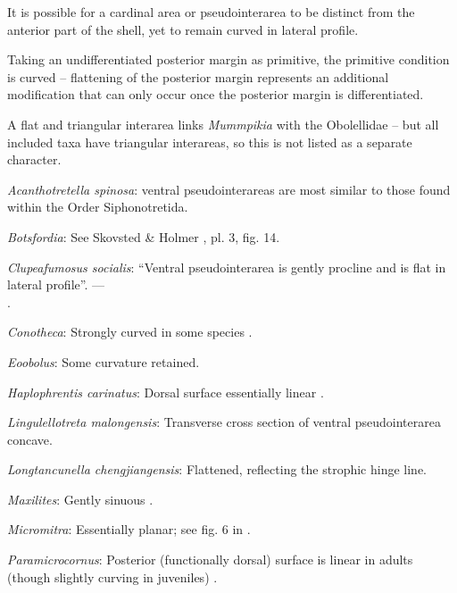 \documentclass[openany]{book}
\begin{document}
It is possible for a cardinal area or pseudointerarea to be distinct
from the anterior part of the shell, yet to remain curved in lateral
profile.

Taking an undifferentiated posterior margin as primitive, the primitive
condition is curved -- flattening of the posterior margin represents an
additional modification that can only occur once the posterior margin is
differentiated.

A flat and triangular interarea links \emph{Mummpikia} with the
Obolellidae \citep{Balthasar2008iMummpikia} -- but all included taxa
have triangular interareas, so this is not listed as a separate
character.

\hypertarget{Acanthotretella_spinosa-coding-108}{}
\emph{Acanthotretella spinosa}: ventral pseudointerareas are most
similar to those found within the Order Siphonotretida.

\hypertarget{Botsfordia-coding-108}{}
\emph{Botsfordia}: See Skovsted \& Holmer
\citeyearpar{Skovsted2005EarlyCambrian}, pl. 3, fig. 14.

\hypertarget{Clupeafumosus_socialis-coding-108}{}
\emph{Clupeafumosus socialis}: ``Ventral pseudointerarea is gently
procline and is flat in lateral profile''. ---\\
\citep{Topper2013Reappraisalof}.

\hypertarget{Conotheca-coding-108}{}
\emph{Conotheca}: Strongly curved in some species \citep{Wrona2003}.

\hypertarget{Eoobolus-coding-108}{}
\emph{Eoobolus}: Some curvature retained.

\hypertarget{Haplophrentis_carinatus-coding-108}{}
\emph{Haplophrentis carinatus}: Dorsal surface essentially linear
\citep[fig ed6a, ed7a]{Moysiuk2017Hyolithsare}.

\hypertarget{Lingulellotreta_malongensis-coding-108}{}
\emph{Lingulellotreta malongensis}: Transverse cross section of ventral
pseudointerarea concave.

\hypertarget{Longtancunella_chengjiangensis-coding-108}{}
\emph{Longtancunella chengjiangensis}: Flattened, reflecting the
strophic hinge line.

\hypertarget{Maxilites-coding-108}{}
\emph{Maxilites}: Gently sinuous \citep{MartiMus2005}.

\hypertarget{Micromitra-coding-108}{}
\emph{Micromitra}: Essentially planar; see fig. 6 in
\citet{Ushatinskaya2016Protegulumand}.

\hypertarget{Paramicrocornus-coding-108}{}
\emph{Paramicrocornus}: Posterior (functionally dorsal) surface is
linear in adults (though slightly curving in juveniles)
\citep{Zhang2018Ahyolithid}.
\end{document}

